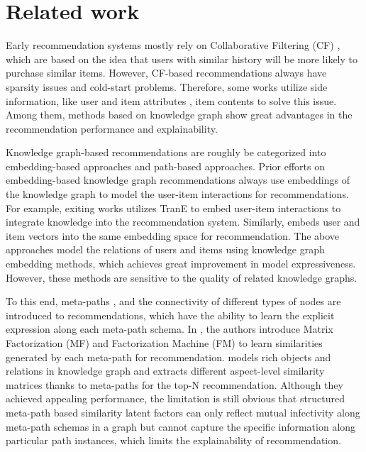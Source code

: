\section{Related work}
\label{sec_related_work}

Early recommendation systems mostly rely on Collaborative Filtering (CF) \cite{schafer2007collaborative, sarwar2001item}, which are based on the idea that users with similar history will be more likely to purchase similar items. However, CF-based recommendations always have sparsity issues and cold-start problems. Therefore, some works utilize side information, like user and item attributes \cite{gong2009employing}, item contents \cite{melville2002content} to solve this issue. Among them, methods based on knowledge graph \cite{wang2020reinforced, xian2019reinforcement, zhu2020knowledge, wang2019explainable} show great advantages in the recommendation performance and explainability. 

Knowledge graph-based recommendations are roughly be categorized into embedding-based approaches and path-based approaches. Prior efforts on embedding-based knowledge graph recommendations \cite{zhang2016collaborative} always use embeddings of the knowledge graph to model the user-item interactions for recommendations. For example, exiting works \cite{huang2018improving} utilizes TranE \cite{bordes2013translating} to embed user-item interactions to integrate knowledge into the recommendation system. Similarly, \cite{grad2017graph} embeds user and item vectors into the same embedding space for recommendation. The above approaches model the relations of users and items using knowledge graph embedding methods, which achieves great improvement in model expressiveness. However, these methods are sensitive to the quality of related knowledge graphs.

To this end, meta-paths \cite{sun2011pathsim}, and the connectivity of different types of nodes are introduced to recommendations, which have the ability to learn the explicit expression along each meta-path schema. In \cite{zhao2017meta}, the authors introduce Matrix Factorization (MF) and Factorization Machine (FM) to learn similarities generated by each meta-path for recommendation. \cite{han2018aspect} models rich objects and relations in knowledge graph and extracts different aspect-level similarity matrices thanks to meta-paths for the top-N recommendation. Although they achieved appealing performance, the limitation is still obvious that structured meta-path based similarity latent factors can only reflect mutual infectivity along meta-path schemas in a graph but cannot capture the specific information along particular path instances, which limits the explainability of recommendation.

